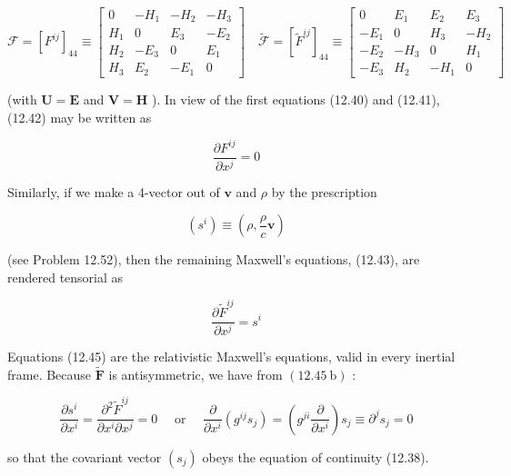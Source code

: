 \documentclass[10pt]{article}
\begin{document}
\[
\mathscr{F}=\left[F^{i j}\right]_{44} \equiv\left[\begin{array}{cccc}
0 & -H_{1} & -H_{2} & -H_{3}  \tag{12.44}\\
H_{1} & 0 & E_{3} & -E_{2} \\
H_{2} & -E_{3} & 0 & E_{1} \\
H_{3} & E_{2} & -E_{1} & 0
\end{array}\right] \quad \tilde{\mathscr{F}}=\left[\tilde{F}^{i j}\right]_{44} \equiv\left[\begin{array}{ccccc}
0 & E_{1} & E_{2} & E_{3} \\
-E_{1} & 0 & H_{3} & -H_{2} \\
-E_{2} & -H_{3} & 0 & H_{1} \\
-E_{3} & H_{2} & -H_{1} & 0
\end{array}\right]
\]

(with $\mathbf{U}=\mathbf{E}$ and $\mathbf{V}=\mathbf{H}$ ). In view of the first equations (12.40) and (12.41), (12.42) may be written as


\begin{equation*}
\frac{\partial F^{i j}}{\partial x^{j}}=0 \tag{12.45a}
\end{equation*}


Similarly, if we make a 4-vector out of $\mathbf{v}$ and $\rho$ by the prescription


\begin{equation*}
\left(s^{i}\right) \equiv\left(\rho, \frac{\rho}{c} \mathbf{v}\right) \tag{12.46}
\end{equation*}


(see Problem 12.52), then the remaining Maxwell's equations, (12.43), are rendered tensorial as


\begin{equation*}
\frac{\partial \tilde{F}^{i j}}{\partial x^{j}}=s^{i} \tag{12.45b}
\end{equation*}


Equations (12.45) are the relativistic Maxwell's equations, valid in every inertial frame. Because $\tilde{\mathbf{F}}$ is antisymmetric, we have from $(12.45 \mathrm{~b})$ :

$$
\frac{\partial s^{i}}{\partial x^{i}}=\frac{\partial^{2} \tilde{F}^{i j}}{\partial x^{i} \partial x^{j}}=0 \quad \text { or } \quad \frac{\partial}{\partial x^{i}}\left(g^{i j} s_{j}\right)=\left(g^{j i} \frac{\partial}{\partial x^{i}}\right) s_{j} \equiv \partial^{j} s_{j}=0
$$

so that the covariant vector $\left(s_{j}\right)$ obeys the equation of continuity (12.38).
\end{document}
